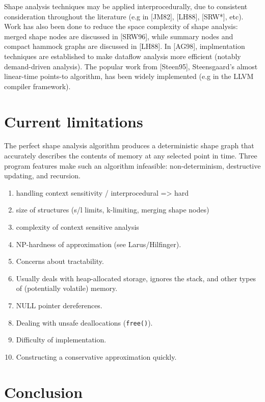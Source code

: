 \documentclass{article}
\begin{document}
Shape analysis techniques may be applied interprocedurally, due to
consistent consideration throughout the literature (e.g in [JM82], [LH88],
[SRW*], etc). Work has also been done to reduce the space complexity of
shape analysis: merged shape nodes are discussed in [SRW96], while summary
nodes and compact hammock graphs are discussed in [LH88]. In [AG98],
implmentation techniques are established to make dataflow analysis more
efficient (notably demand-driven analysis). The popular work from [Steen95],
Steensgaard's almost linear-time points-to algorithm, has been widely
implemented (e.g in the LLVM compiler framework).

\section{Current limitations}

The perfect shape analysis algorithm produces a deterministic shape graph
that accurately describes the contents of memory at any selected point in
time. Three program features make such an algorithm infeasible:
non-determinism, destructive updating, and recursion. 

\begin{enumerate}[1.]
    \item handling context sensitivity / interprocedural => hard
    \item size of structures (s/l limits, k-limiting, merging shape nodes)
    \item complexity of context sensitive analysis
    \item NP-hardness of approximation (see Larus/Hilfinger).
    \item Concerns about tractability.
    \item Usually deals with heap-allocated storage, ignores the stack, and
        other types of (potentially volatile) memory.
    \item NULL pointer dereferences.
    \item Dealing with unsafe deallocations (\texttt{free()}).
    \item Difficulty of implementation.
    \item Constructing a conservative approximation quickly.
\end{enumerate}

\section{Conclusion}
\end{document}

